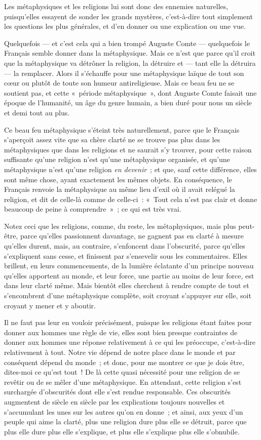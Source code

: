 \documentclass[french,twoside]{book} %
\begin{document}
 Les métaphysiques et les religions lui sont donc des ennemies naturelles, puisqu’elles essayent de sonder les grands mystères, c’est-à-dire tout simplement les questions les plus générales, et d’en donner ou une explication ou une vue.\par
Quelquefois — et c’est cela qui a bien trompé Auguste Comte — quelquefois le Français semble donner dans la métaphysique. Mais ce n’est que parce qu’il croit que la métaphysique va détrôner la religion, la détruire et — tant elle la détruira — la remplacer. Alors il s’échauffe pour une métaphysique laïque de tout son cœur ou plutôt de toute son humeur antireligieuse. Mais ce beau feu ne se soutient pas, et cette « période métaphysique », dont Auguste Comte faisait une époque de l’humanité, un âge du genre humain, a bien duré pour nous un siècle et demi tout au plus.\par
Ce beau feu métaphysique s’éteint très naturellement, parce que le Français s’aperçoit assez vite que sa chère clarté ne se trouve pas plus dans les métaphysiques que dans les religions et ne saurait s’y trouver, pour cette raison suffisante qu’une religion n’est qu’une métaphysique organisée, et qu’une métaphysique n’est qu’une religion {\itshape en devenir} ; et que, sauf cette différence, elles sont même chose, ayant exactement les mêmes objets. En conséquence, le Français renvoie la métaphysique  au même lieu d’exil où il avait relégué la religion, et dit de celle-là comme de celle-ci : « Tout cela n’est pas clair et donne beaucoup de peine à comprendre » ; ce qui est très vrai.\par
Notez ceci que les religions, comme, du reste, les métaphysiques, mais plus peut-être, parce qu’elles passionnent davantage, ne gagnent pas en clarté à mesure qu’elles durent, mais, au contraire, s’enfoncent dans l’obscurité, parce qu’elles s’expliquent sans cesse, et finissent par s’ensevelir sous les commentaires. Elles brillent, en leurs commencements, de la lumière éclatante d’un principe nouveau qu’elles apportent au monde, et leur force, une partie au moins de leur force, est dans leur clarté même. Mais bientôt elles cherchent à rendre compte de tout et s’encombrent d’une métaphysique complète, soit croyant s’appuyer sur elle, soit croyant y mener et y aboutir.\par
Il ne faut pas leur en vouloir précisément, puisque les religions étant faites pour donner aux hommes une règle de vie, elles sont bien presque contraintes de donner aux hommes une réponse relativement à ce qui les préoccupe, c’est-à-dire relativement à tout. Notre vie dépend de notre place dans le monde et par conséquent dépend du monde ; et donc, pour me montrer ce que je dois être, dites-moi ce qu’est tout ! De là cette quasi  nécessité pour une religion de se revêtir ou de se mêler d’une métaphysique. En attendant, cette religion s’est surchargée d’obscurités dont elle s’est rendue responsable. Ces obscurités augmentent de siècle en siècle par les explications toujours nouvelles et s’accumulant les unes sur les autres qu’on en donne ; et ainsi, aux yeux d’un peuple qui aime la clarté, plus une religion dure plus elle se détruit, parce que plus elle dure plus elle s’explique, et plus elle s’explique plus elle s’obnubile.\par
\end{document}
